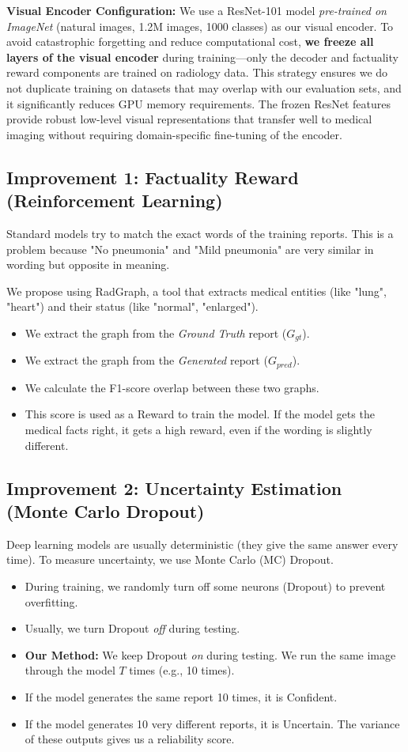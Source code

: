 \documentclass[11pt,a4paper]{article}
\begin{document}
\textbf{Visual Encoder Configuration:} We use a ResNet-101 model \textit{pre-trained on ImageNet} (natural images, 1.2M images, 1000 classes) as our visual encoder. To avoid catastrophic forgetting and reduce computational cost, \textbf{we freeze all layers of the visual encoder} during training—only the decoder and factuality reward components are trained on radiology data. This strategy ensures we do not duplicate training on datasets that may overlap with our evaluation sets, and it significantly reduces GPU memory requirements. The frozen ResNet features provide robust low-level visual representations that transfer well to medical imaging without requiring domain-specific fine-tuning of the encoder.

\subsection{Improvement 1: Factuality Reward (Reinforcement Learning)}
Standard models try to match the exact words of the training reports. This is a problem because "No pneumonia" and "Mild pneumonia" are very similar in wording but opposite in meaning.

We propose using RadGraph, a tool that extracts medical entities (like "lung", "heart") and their status (like "normal", "enlarged"). 
\begin{itemize}
    \item We extract the graph from the \textit{Ground Truth} report ($G_{gt}$).
    \item We extract the graph from the \textit{Generated} report ($G_{pred}$).
    \item We calculate the F1-score overlap between these two graphs.
    \item This score is used as a Reward to train the model. If the model gets the medical facts right, it gets a high reward, even if the wording is slightly different.
\end{itemize}

\subsection{Improvement 2: Uncertainty Estimation (Monte Carlo Dropout)}
Deep learning models are usually deterministic (they give the same answer every time). To measure uncertainty, we use Monte Carlo (MC) Dropout.
\begin{itemize}
    \item During training, we randomly turn off some neurons (Dropout) to prevent overfitting.
    \item Usually, we turn Dropout \textit{off} during testing.
    \item \textbf{Our Method:} We keep Dropout \textit{on} during testing. We run the same image through the model $T$ times (e.g., 10 times).
    \item If the model generates the same report 10 times, it is Confident.
    \item If the model generates 10 very different reports, it is Uncertain. The variance of these outputs gives us a reliability score.
\end{itemize}
\end{document}
